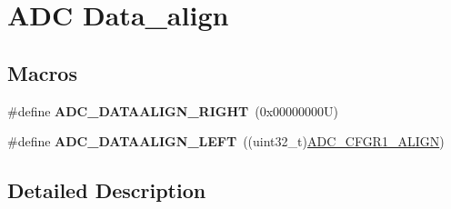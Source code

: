 \hypertarget{group___a_d_c___data__align}{}\section{A\+DC Data\+\_\+align}
\label{group___a_d_c___data__align}
\subsection*{Macros}
\begin{DoxyCompactItemize}
\item 
\mbox{\label{group___a_d_c___data__align_gafed5c0d327ad6d2cc0960f7943beb265}} 
\#define {\bfseries A\+D\+C\+\_\+\+D\+A\+T\+A\+A\+L\+I\+G\+N\+\_\+\+R\+I\+G\+HT}~(0x00000000\+U)
\item 
\mbox{\label{group___a_d_c___data__align_ga8afeead661c1ffbc27a5405a254d60ba}} 
\#define {\bfseries A\+D\+C\+\_\+\+D\+A\+T\+A\+A\+L\+I\+G\+N\+\_\+\+L\+E\+FT}~((uint32\+\_\+t)\hyperlink{group___peripheral___registers___bits___definition_ga48d91913f0fe8acb7a07de52505a1fa7}{A\+D\+C\+\_\+\+C\+F\+G\+R1\+\_\+\+A\+L\+I\+GN})
\end{DoxyCompactItemize}


\subsection{Detailed Description}
